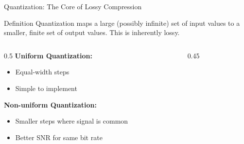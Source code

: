 \documentclass[aspectratio=169,12pt]{beamer}
\begin{document}
\begin{frame}{Quantization: The Core of Lossy Compression}
    \begin{block}{Definition}
        Quantization maps a large (possibly infinite) set of input values to a smaller, finite set of output values. This is inherently lossy.
    \end{block}
    
    \vspace{0.2cm}
    \begin{columns}
        \begin{column}{0.5\textwidth}
            \textbf{Uniform Quantization:}
            \begin{itemize}
                \item Equal-width steps
                \item Simple to implement
            \end{itemize}
            
            \vspace{0.2cm}
            \textbf{Non-uniform Quantization:}
            \begin{itemize}
                \item Smaller steps where signal is common
                \item Better SNR for same bit rate
            \end{itemize}
        \end{column}
        \begin{column}{0.45\textwidth}
            \begin{center}
            \end{center}
        \end{column}
    \end{columns}
\end{frame}
\end{document}
